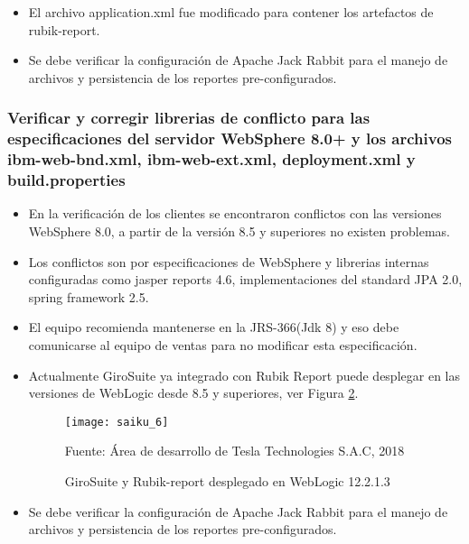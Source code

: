 \begin{spacing}{1.5}
\begin{itemize}
				\begin{figure}[H]
					\centering
					\texttt{[image: saiku\_6]}
					\caption {\centering \small{GiroSuite y Rubik-report desplegado en WebLogic 12.2.1.3}} \label{figure:chaperIII_8}
					\small {Fuente: \'{A}rea de desarrollo de Tesla Technologies S.A.C, 2018}
				\end{figure}

				\item El archivo application.xml fue modificado para contener los artefactos de rubik-report.
				\item Se debe verificar la configuraci\'{o}n de Apache Jack Rabbit para el manejo de archivos y persistencia de los reportes pre-configurados. 
			\end{itemize}
		
		
		\subsubsection{Verificar y corregir librerias de conflicto para las especificaciones del servidor WebSphere 8.0+ y los archivos ibm-web-bnd.xml, ibm-web-ext.xml, deployment.xml y build.properties}
			\begin{itemize}
				\item En la verificaci\'{o}n de los clientes se encontraron conflictos con las versiones WebSphere 8.0, a partir de la versi\'{o}n 8.5 y superiores no existen problemas.
				\item Los conflictos son por especificaciones de WebSphere y librerias internas configuradas como jasper reports 4.6, implementaciones del standard JPA 2.0, spring framework 2.5.
				\item El equipo recomienda mantenerse en la JRS-366(Jdk 8) y eso debe comunicarse al equipo de ventas para no modificar esta especificaci\'{o}n.
				\item Actualmente GiroSuite ya integrado con Rubik Report puede desplegar en las versiones de WebLogic desde 8.5 y superiores, ver Figura \ref{figure:chaperIII_9}.
				
				\begin{figure}[H]
					\centering
					\texttt{[image: saiku\_6]}
					\caption {\centering \small{GiroSuite y Rubik-report desplegado en WebLogic 12.2.1.3}} \label{figure:chaperIII_9}
					\small {Fuente: \'{A}rea de desarrollo de Tesla Technologies S.A.C, 2018}
				\end{figure}
				
				\item Se debe verificar la configuraci\'{o}n de Apache Jack Rabbit para el manejo de archivos y persistencia de los reportes pre-configurados. 
			\end{itemize}
				

\end{spacing}
